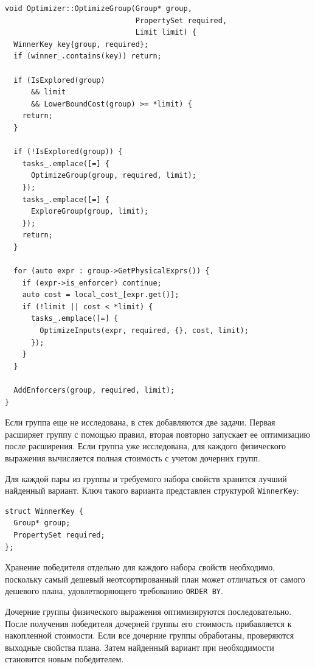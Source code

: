 \documentclass[fontsize=14pt, russian]{scrartcl}
\begin{document}
\begin{listing}[H]
  \caption{Оптимизация группы Memo.}
  \label{lst:optimize-group}
  \begin{verbatim}
void Optimizer::OptimizeGroup(Group* group,
                              PropertySet required,
                              Limit limit) {
  WinnerKey key{group, required};
  if (winner_.contains(key)) return;

  if (IsExplored(group)
      && limit
      && LowerBoundCost(group) >= *limit) {
    return;
  }

  if (!IsExplored(group)) {
    tasks_.emplace([=] {
      OptimizeGroup(group, required, limit);
    });
    tasks_.emplace([=] {
      ExploreGroup(group, limit);
    });
    return;
  }

  for (auto expr : group->GetPhysicalExprs()) {
    if (expr->is_enforcer) continue;
    auto cost = local_cost_[expr.get()];
    if (!limit || cost < *limit) {
      tasks_.emplace([=] {
        OptimizeInputs(expr, required, {}, cost, limit);
      });
    }
  }

  AddEnforcers(group, required, limit);
}
  \end{verbatim}
\end{listing}

Если группа еще не исследована, в стек добавляются две задачи. Первая расширяет
группу с помощью правил, вторая повторно запускает ее оптимизацию после
расширения. Если группа уже исследована, для каждого физического выражения
вычисляется полная стоимость с учетом дочерних групп.

Для каждой пары из группы и требуемого набора свойств хранится лучший найденный
вариант. Ключ такого варианта представлен структурой \verb|WinnerKey|:

\begin{verbatim}
struct WinnerKey {
  Group* group;
  PropertySet required;
};
\end{verbatim}

Хранение победителя отдельно для каждого набора свойств необходимо, поскольку
самый дешевый неотсортированный план может отличаться от самого дешевого плана,
удовлетворяющего требованию \verb|ORDER BY|.

Дочерние группы физического выражения оптимизируются последовательно. После
получения победителя дочерней группы его стоимость прибавляется к накопленной
стоимости. Если все дочерние группы обработаны, проверяются выходные свойства
плана. Затем найденный вариант при необходимости становится новым победителем.
\end{document}
